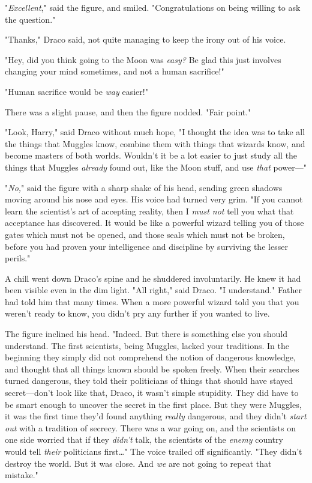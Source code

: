 "\emph{Excellent}," said the figure, and smiled. "Congratulations on being
willing to ask the question."

"Thanks," Draco said, not quite managing to keep the irony out of his voice.

"Hey, did you think going to the Moon was \emph{easy?} Be glad this just
involves changing your mind sometimes, and not a human sacrifice!"

"Human sacrifice would be \emph{way} easier!"

There was a slight pause, and then the figure nodded. "Fair point."

"Look, Harry," said Draco without much hope, "I thought the idea was to take
all the things that Muggles know, combine them with things that wizards know,
and become masters of both worlds. Wouldn't it be a lot easier to just study
all the things that Muggles \emph{already} found out, like the Moon stuff, and
use \emph{that} power---"

"\emph{No,}" said the figure with a sharp shake of his head, sending green
shadows moving around his nose and eyes. His voice had turned very grim. "If
you cannot learn the scientist's art of accepting reality, then I \emph{must
not} tell you what that acceptance has discovered. It would be like a powerful
wizard telling you of those gates which must not be opened, and those seals
which must not be broken, before you had proven your intelligence and
discipline by surviving the lesser perils."

A chill went down Draco's spine and he shuddered involuntarily. He knew it had
been visible even in the dim light. "All right," said Draco. "I understand."
Father had told him that many times. When a more powerful wizard told you that
you weren't ready to know, you didn't pry any further if you wanted to live.

The figure inclined his head. "Indeed. But there is something else you should
understand. The first scientists, being Muggles, lacked your traditions. In the
beginning they simply did not comprehend the notion of dangerous knowledge, and
thought that all things known should be spoken freely. When their searches
turned dangerous, they told their politicians of things that should have stayed
secret---don't look like that, Draco, it wasn't simple stupidity. They did have
to be smart enough to uncover the secret in the first place. But they were
Muggles, it was the first time they'd found anything \emph{really} dangerous,
and they didn't \emph{start out} with a tradition of secrecy. There was a war
going on, and the scientists on one side worried that if they \emph{didn't}
talk, the scientists of the \emph{enemy} country would tell \emph{their}
politicians first{\ldots}" The voice trailed off significantly. "They didn't
destroy the world. But it was close. And \emph{we} are not going to repeat that
mistake."

